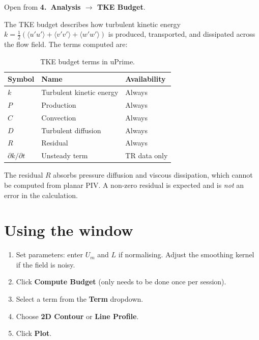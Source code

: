 \documentclass[11pt, a4paper]{report}
\newcommand{\uipth}[1]{\textbf{\textcolor{upblue}{#1}}}
\begin{document}
Open from \uipth{4.\ Analysis $\to$ TKE Budget}.

The TKE budget describes how turbulent kinetic energy $k = \tfrac{1}{2}(\langle u'u'\rangle + \langle v'v'\rangle + \langle w'w'\rangle)$ is produced, transported, and dissipated across the flow field. The terms computed are:

\begin{table}[htbp]
\centering
\caption{TKE budget terms in uPrime.}
\begin{tabular}{lll}
\toprule
\textbf{Symbol} & \textbf{Name} & \textbf{Availability} \\
\midrule
$k$                     & Turbulent kinetic energy  & Always \\
$P$                     & Production                & Always \\
$C$                     & Convection                & Always \\
$D$                     & Turbulent diffusion       & Always \\
$R$                     & Residual                  & Always \\
$\partial k/\partial t$ & Unsteady term             & TR data only \\
\bottomrule
\end{tabular}
\end{table}

\begin{notebox}
The residual $R$ absorbs pressure diffusion and viscous dissipation, which cannot be computed from planar PIV. A non-zero residual is expected and is \emph{not} an error in the calculation.
\end{notebox}

\section{Using the window}

\begin{stepbox}
\begin{enumerate}[leftmargin=1.5em, topsep=2pt]
  \item Set parameters: enter $U_m$ and $L$ if normalising. Adjust the smoothing kernel if the field is noisy.
  \item Click \uipth{Compute Budget} (only needs to be done once per session).
  \item Select a term from the \uipth{Term} dropdown.
  \item Choose \uipth{2D Contour} or \uipth{Line Profile}.
  \item Click \uipth{Plot}.
\end{enumerate}
\end{stepbox}
\end{document}
